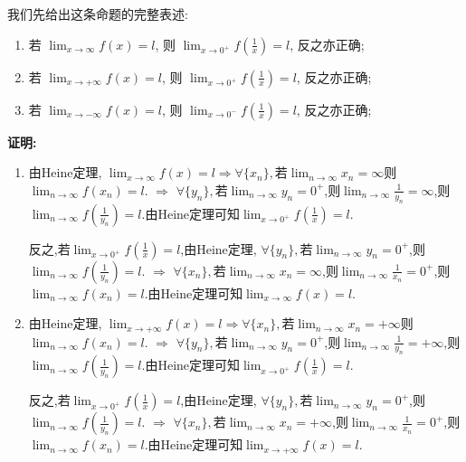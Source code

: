 \begin{solution}
    我们先给出这条命题的完整表述:
    \begin{proposition*}
        \begin{enumerate}[(1)]
            \item 若 $\lim_{x \to \infty} f(x) = l$, 则 $\lim_{x \to 0^+} f\left(\frac{1}{x}\right)=l$, 反之亦正确;
            \item 若 $\lim_{x \to +\infty} f(x) = l$, 则 $\lim_{x \to 0^+} f\left(\frac{1}{x}\right)=l$, 反之亦正确;
            \item 若 $\lim_{x \to -\infty} f(x) = l$, 则 $\lim_{x \to 0^-} f\left(\frac{1}{x}\right)=l$, 反之亦正确;
        \end{enumerate}
    \end{proposition*}
    \noindent
    \textbf{证明:}
    \begin{enumerate}[(1)]
        \item 由Heine定理, $\lim_{x \to \infty} f(x) = l \Rightarrow \forall \{x_n\}, $若$\lim_{n \to \infty} x_n = \infty$则$\lim_{n \to \infty} f(x_n) = l$. $\Rightarrow$ $\forall \{ y_n \}, $若$\lim_{n \to \infty} y_n = 0^+$,则$\lim_{n \to \infty} \frac{1}{y_n} = \infty$,则$\lim_{n \to \infty} f\left( \frac{1}{y_n} \right) = l$.由Heine定理可知$\lim_{x \to 0^+} f\left(\frac{1}{x}\right)=l$.

              反之,若$\lim_{x \to 0^+} f\left(\frac{1}{x}\right)=l$,由Heine定理, $\forall \{y_n\}, $若$\lim_{n \to \infty} y_n = 0^+$,则$\lim_{n \to \infty} f\left( \frac{1}{y_n} \right) = l$. $\Rightarrow$ $\forall \{x_n\}, $若$\lim_{n \to \infty} x_n = \infty$,则$\lim_{n \to \infty} \frac{1}{x_n} = 0^+$,则$\lim_{n \to \infty} f(x_n) = l$.由Heine定理可知$\lim_{x \to \infty} f(x) = l$.
        \item 由Heine定理, $\lim_{x \to +\infty} f(x) = l \Rightarrow \forall \{x_n\}, $若$\lim_{n \to \infty} x_n = +\infty$则$\lim_{n \to \infty} f(x_n) = l$. $\Rightarrow$ $\forall \{ y_n \}, $若$\lim_{n \to \infty} y_n = 0^+$,则$\lim_{n \to \infty} \frac{1}{y_n} = +\infty$,则$\lim_{n \to \infty} f\left( \frac{1}{y_n} \right) = l$.由Heine定理可知$\lim_{x \to 0^+} f\left(\frac{1}{x}\right)=l$.

              反之,若$\lim_{x \to 0^+} f\left(\frac{1}{x}\right)=l$,由Heine定理, $\forall \{y_n\}, $若$\lim_{n \to \infty} y_n = 0^+$,则$\lim_{n \to \infty} f\left( \frac{1}{y_n} \right) = l$. $\Rightarrow$ $\forall \{x_n\}, $若$\lim_{n \to \infty} x_n = +\infty$,则$\lim_{n \to \infty} \frac{1}{x_n} = 0^+$,则$\lim_{n \to \infty} f(x_n) = l$.由Heine定理可知$\lim_{x \to +\infty} f(x) = l$.


\end{enumerate}
\end{solution}
